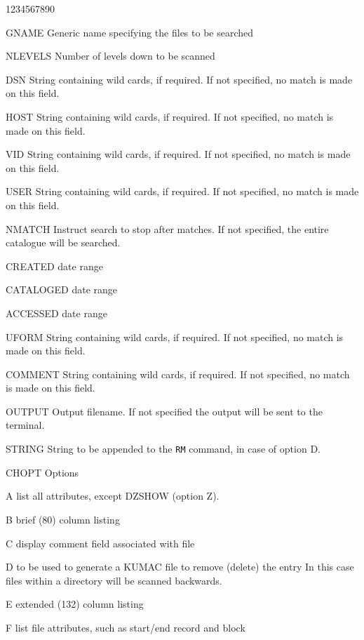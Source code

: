 \begin{DLtt}{1234567890}
\item[GNAME]Generic name specifying the files to be searched
\item[NLEVELS]Number of levels down to be scanned
\item[DSN]String containing wild cards, if required. If not specified,
no match is made on this field.
\item[HOST]String containing wild cards, if required. If not specified,
no match is made on this field.
\item[VID]String containing wild cards, if required. If not specified,
no match is made on this field.
\item[USER]String containing wild cards, if required. If not specified,
no match is made on this field.
\item[NMATCH]Instruct search to stop after  matches. If
not specified, the entire catalogue will be searched.
\item[CREATED]date range
\item[CATALOGED]date range
\item[ACCESSED]date range
\item[UFORM]String containing wild cards, if required. If not specified,
no match is made on this field.
\item[COMMENT]String containing wild cards, if required. If not specified,
no match is made on this field.
\item[OUTPUT]Output filename. If not specified the output will 
be sent to the terminal.
\item[STRING]String to be appended to the {\tt RM} command, in case
of option D.
\item[CHOPT]Options
\begin{DLtt}{12}
\item[A]list all attributes, except DZSHOW (option Z).
\item[B]brief (80) column listing
\item[C]display comment field associated with file
\item[D]to be used to generate a KUMAC file to remove (delete) the entry
In this case files within a directory will be scanned backwards.
\item[E]extended (132) column listing
\item[F]list file attributes, such as start/end record and block

\end{DLtt}
\end{DLtt}

